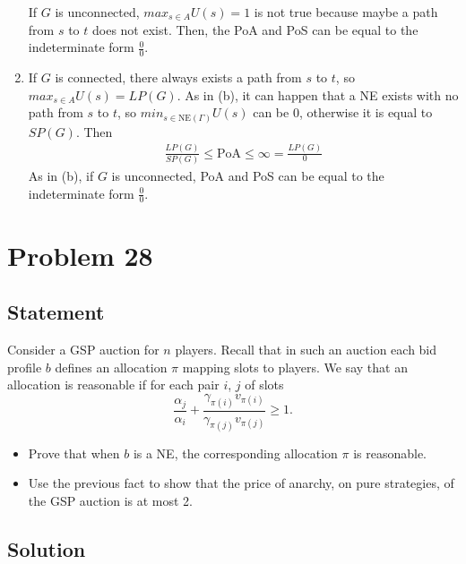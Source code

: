 \documentclass[a4paper, 11pt]{article}
\begin{document}
\begin{enumerate}[label=(\alph*)]
        If $G$ is unconnected, $max_{s \in A} U(s) = 1$ is not true because maybe a path from $s$ to $t$ does not exist. Then, the PoA and PoS can be equal to the indeterminate form $\frac{0}{0}$.
    \item If $G$ is connected, there always exists a path from $s$ to $t$, so $max_{s \in A} U(s) = LP(G)$. As in (b), it can happen that a NE exists with no path from $s$ to $t$, so $min_{s \in \text{NE}(\Gamma)} U(s)$ can be 0, otherwise it is equal to $SP(G)$. Then
        \begin{align}
            \frac{LP(G)}{SP(G)} \leq \text{PoA} \leq \infty = \frac{LP(G)}{0}
        \end{align}
        As in (b), if $G$ is unconnected, PoA and PoS can be equal to the indeterminate form $\frac{0}{0}$.
\end{enumerate}


\section*{Problem 28}
{\color{statement}
\subsection*{Statement}
Consider a GSP auction for $n$ players. Recall that in such an auction each bid profile $b$ defines an allocation $\pi$ mapping slots to players. We say that an allocation is reasonable if for each pair $i$, $j$ of slots
\begin{equation*}
    \frac{\alpha_j}{\alpha_i} + \frac{\gamma_{\pi(i)}v_{\pi(i)}}{\gamma_{\pi(j)}v_{\pi(j)}} \geq 1.
\end{equation*}
\begin{itemize}
    \item Prove that when $b$ is a NE, the corresponding allocation $\pi$ is reasonable.
    \item Use the previous fact to show that the price of anarchy, on pure strategies, of the GSP auction is at most 2.
\end{itemize}

}
\subsection*{Solution}
\end{document}
